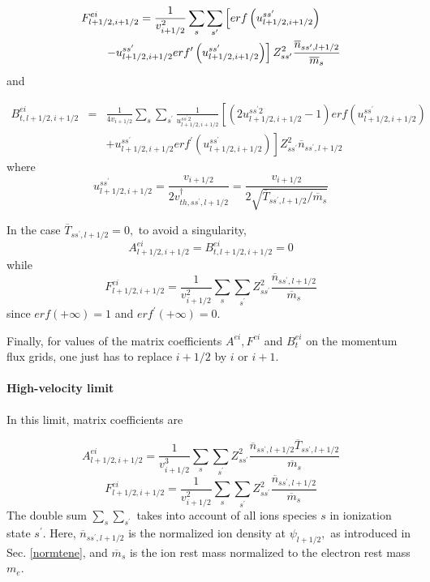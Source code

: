 \begin{align}
&F_{l+1/2,i+1/2}^{ei}=\frac{1}{v_{i+1/2}^{2}}\sum_{s}\sum_{s^{\prime
}}\left[ erf \left( u_{l+1/2,i+1/2}^{ss^{\prime
}}\right)\right.\nonumber\\&\qquad\left.
-u_{l+1/2,i+1/2}^{ss^{\prime }}erf ^{\prime }\left(
u_{l+1/2,i+1/2}^{ss^{\prime }}\right) \right] Z_{ss^{\prime }}^{2}\frac{%
\overline{n}_{ss^{\prime },l+1/2}}{\overline{m}_{s}}
\end{align}
and

\begin{eqnarray}
B_{t,l+1/2,i+1/2}^{ei} &=&\frac{1}{4v_{i+1/2}}\sum_{s}\sum_{s^{\prime }}%
\frac{1}{u_{l+1/2,i+1/2}^{ss^{\prime }2}}\left[ \left(
2u_{l+1/2,i+1/2}^{ss^{\prime }2}-1\right) erf \left(
u_{l+1/2,i+1/2}^{ss^{\prime }}\right) \right.  \nonumber \\
&&\left. +u_{l+1/2,i+1/2}^{ss^{\prime }}erf ^{\prime }\left(
u_{l+1/2,i+1/2}^{ss^{\prime }}\right) \right] Z_{ss^{\prime }}^{2}\overline{n%
}_{ss^{\prime },l+1/2}
\end{eqnarray}
where
\[
u_{l+1/2,i+1/2}^{ss^{\prime }}=\frac{v_{i+1/2}}{2v_{th,ss^{\prime
},l+1/2}^{\dagger }}=\frac{v_{i+1/2}}{2\sqrt{\overline{T}_{ss^{\prime
},l+1/2}/\overline{m}_{s}}}
\]

In the case $\overline{T}_{ss^{\prime },l+1/2}=0,$ to avoid a singularity,
\begin{equation}
A_{l+1/2,i+1/2}^{ei}=B_{t,l+1/2,i+1/2}^{ei}=0
\end{equation}
while
\begin{equation}
F_{l+1/2,i+1/2}^{ei}=\frac{1}{v_{i+1/2}^{2}}\sum_{s}\sum_{s^{\prime
}}Z_{ss^{\prime }}^{2}\frac{\overline{n}_{ss^{\prime },l+1/2}}{\overline{m}%
_{s}}
\end{equation}
since $erf \left( +\infty \right) =1$ and $erf ^{\prime }\left( +\infty
\right) =0.$

Finally, for values of the matrix coefficients $A^{ei},F^{ei}$ and $%
B_{t}^{ei}$ on the momentum flux grids, one just has to replace $i+1/2$ by $%
i $ or $i+1$.

\paragraph{High-velocity limit}

In this limit, matrix coefficients are

\begin{equation}
A_{l+1/2,i+1/2}^{ei}=\frac{1}{v_{i+1/2}^{3}}\sum_{s}\sum_{s^{\prime
}}Z_{ss^{\prime }}^{2}\frac{\overline{n}_{ss^{\prime },l+1/2}\overline{T}%
_{ss^{\prime },l+1/2}}{\overline{m}_{s}}
\end{equation}
\begin{equation}
F_{l+1/2,i+1/2}^{ei}=\frac{1}{v_{i+1/2}^{2}}\sum_{s}\sum_{s^{\prime
}}Z_{ss^{\prime }}^{2}\frac{\overline{n}_{ss^{\prime },l+1/2}}{\overline{m}%
_{s}}
\end{equation}
The double sum $\sum_{s}\sum_{s^{\prime }}$ takes into account of all ions
species $s$ in ionization state $s^{\prime }.$ Here, $\overline{n}%
_{ss^{\prime },l+1/2}$ is the normalized ion density at $\psi _{l+1/2},$ as
introduced in Sec. \ref{normtene}, and $\overline{m}_{s}$ is the ion rest
mass normalized to the electron rest mass $m_{e}$.

